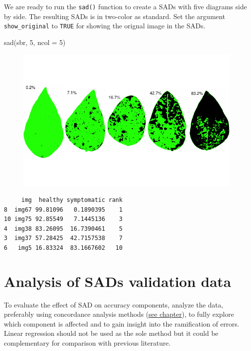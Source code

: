 \documentclass[
  letterpaper,
  DIV=11,
  numbers=noendperiod]{scrreprt}
\newenvironment{Shaded}{\begin{snugshade}}{\end{snugshade}}
\newcommand{\AttributeTok}[1]{\textcolor[rgb]{0.40,0.45,0.13}{#1}}
\newcommand{\DecValTok}[1]{\textcolor[rgb]{0.68,0.00,0.00}{#1}}
\newcommand{\FunctionTok}[1]{\textcolor[rgb]{0.28,0.35,0.67}{#1}}
\newcommand{\NormalTok}[1]{\textcolor[rgb]{0.00,0.23,0.31}{#1}}
\begin{document}
We are ready to run the \texttt{sad()} function to create a SADs with
five diagrams side by side. The resulting SADs is in two-color as
standard. Set the argument \texttt{show\_original} to \texttt{TRUE} for
showing the orignal image in the SADs.

\begin{Shaded}
\begin{Highlighting}[]
\FunctionTok{sad}\NormalTok{(sbr, }\DecValTok{5}\NormalTok{, }\AttributeTok{ncol =} \DecValTok{5}\NormalTok{)}
\end{Highlighting}
\end{Shaded}

\begin{figure}[H]

{\centering \includegraphics{data-sads_files/figure-pdf/unnamed-chunk-2-1.pdf}

}

\end{figure}

\begin{verbatim}
     img  healthy symptomatic rank
8  img67 99.81096   0.1890395    1
10 img75 92.85549   7.1445136    3
4  img38 83.26095  16.7390461    5
3  img37 57.28425  42.7157538    7
6   img5 16.83324  83.1667602   10
\end{verbatim}

\hypertarget{analysis-of-sads-validation-data}{%
\section{Analysis of SADs validation
data}\label{analysis-of-sads-validation-data}}

To evaluate the effect of SAD on accuracy components, analyze the data,
preferably using concordance analysis methods
(\href{data-accuracy.html}{see chapter}), to fully explore which
component is affected and to gain insight into the ramification of
errors. Linear regression should not be used as the sole method but it
could be complementary for comparison with previous literature.
\end{document}
